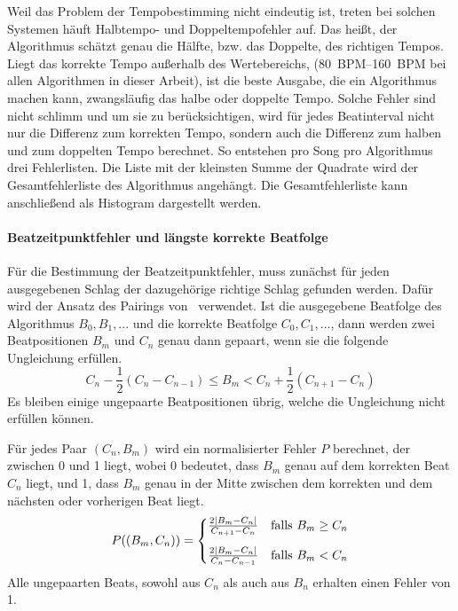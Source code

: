{{{			%
			Weil das Problem der Tempobestimming nicht eindeutig ist,
				treten bei solchen Systemen häuft Halbtempo- und Doppeltempofehler auf.
			Das heißt,
				der Algorithmus schätzt genau die Hälfte, bzw. das Doppelte, des richtigen Tempos.
			Liegt das korrekte Tempo außerhalb des Wertebereichs,
				(\SIrange{80}{160}{BPM} bei allen Algorithmen in dieser Arbeit),
				ist die beste Ausgabe,
				die ein Algorithmus machen kann,
				zwangsläufig das halbe oder doppelte Tempo.
			Solche Fehler sind nicht schlimm
				und um sie zu berücksichtigen,
				wird für jedes Beatinterval nicht nur die Differenz zum korrekten Tempo,
				sondern auch die Differenz zum halben und zum doppelten Tempo berechnet.
			So entstehen pro Song pro Algorithmus drei Fehlerlisten.
			Die Liste mit der kleinsten Summe der Quadrate wird der Gesamtfehlerliste des Algorithmus angehängt.
			Die Gesamtfehlerliste kann anschließend als Histogram dargestellt werden.
		}

		\paragraph{Beatzeitpunktfehler und längste korrekte Beatfolge}
		{
			Für die Bestimmung der Beatzeitpunktfehler,
				muss zunächst für jeden ausgegebenen Schlag der dazugehörige richtige Schlag gefunden werden.
			Dafür wird der Ansatz des Pairings von~\cite{1997_GoMu1} verwendet.
			Ist die ausgegebene Beatfolge des Algorithmus $B_0, B_1, ...$ und die korrekte Beatfolge $C_0, C_1, ...$,
				dann werden zwei Beatpositionen $B_m$ und $C_n$ genau dann gepaart,
				wenn sie die folgende Ungleichung erfüllen.
			\begin{equation}
				C_n - \frac{1}{2}(C_n - C_{n - 1}) \le B_m < C_n + \frac{1}{2}(C_{n + 1} - C_n)
			\end{equation}
			Es bleiben einige ungepaarte Beatpositionen übrig,
				welche die Ungleichung nicht erfüllen können.

			Für jedes Paar $(C_n, B_m)$ wird ein normalisierter Fehler $P$ berechnet,
				der zwischen \num{0} und \num{1} liegt,
				wobei \num{0} bedeutet,
				dass $B_m$ genau auf dem korrekten Beat $C_n$ liegt,
				und \num{1},
				dass $B_m$ genau in der Mitte zwischen dem korrekten und dem nächsten oder vorherigen Beat liegt.
			\begin{equation}
				P((B_m, C_n)) =
					\begin{cases}
						\frac{2|B_m - C_n|}{C_{n + 1} - C_n} & \text{falls } B_m \ge C_n \vspace{3mm} \\
						\frac{2|B_m - C_n|}{C_n - C_{n - 1}} & \text{falls } B_m  <  C_n
					\end{cases}
			\end{equation}
			Alle ungepaarten Beats,
				sowohl aus $C_n$ als auch aus $B_n$ erhalten einen Fehler von \num{1}.

}}}
